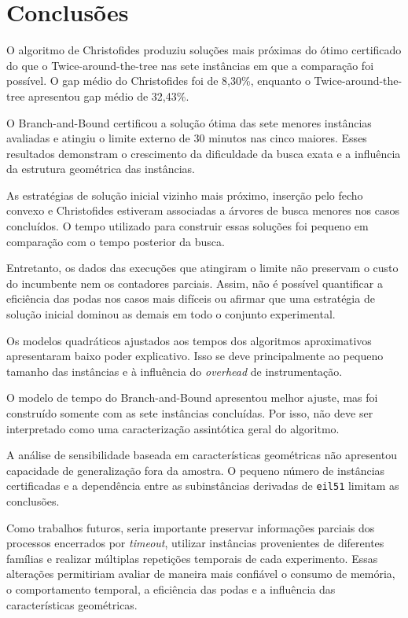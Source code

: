 \documentclass[12pt]{article}
\begin{document}
\section{Conclusões}

O algoritmo de Christofides produziu soluções mais próximas do ótimo certificado do que o Twice-around-the-tree nas sete instâncias em que a comparação foi possível. O gap médio do Christofides foi de 8,30\%, enquanto o Twice-around-the-tree apresentou gap médio de 32,43\%.

O Branch-and-Bound certificou a solução ótima das sete menores instâncias avaliadas e atingiu o limite externo de 30 minutos nas cinco maiores. Esses resultados demonstram o crescimento da dificuldade da busca exata e a influência da estrutura geométrica das instâncias.

As estratégias de solução inicial vizinho mais próximo, inserção pelo fecho convexo e Christofides estiveram associadas a árvores de busca menores nos casos concluídos. O tempo utilizado para construir essas soluções foi pequeno em comparação com o tempo posterior da busca.

Entretanto, os dados das execuções que atingiram o limite não preservam o custo do incumbente nem os contadores parciais. Assim, não é possível quantificar a eficiência das podas nos casos mais difíceis ou afirmar que uma estratégia de solução inicial dominou as demais em todo o conjunto experimental.

Os modelos quadráticos ajustados aos tempos dos algoritmos aproximativos apresentaram baixo poder explicativo. Isso se deve principalmente ao pequeno tamanho das instâncias e à influência do \emph{overhead} de instrumentação.

O modelo de tempo do Branch-and-Bound apresentou melhor ajuste, mas foi construído somente com as sete instâncias concluídas. Por isso, não deve ser interpretado como uma caracterização assintótica geral do algoritmo.

A análise de sensibilidade baseada em características geométricas não apresentou capacidade de generalização fora da amostra. O pequeno número de instâncias certificadas e a dependência entre as subinstâncias derivadas de \texttt{eil51} limitam as conclusões.

Como trabalhos futuros, seria importante preservar informações parciais dos processos encerrados por \emph{timeout}, utilizar instâncias provenientes de diferentes famílias e realizar múltiplas repetições temporais de cada experimento. Essas alterações permitiriam avaliar de maneira mais confiável o consumo de memória, o comportamento temporal, a eficiência das podas e a influência das características geométricas.
\end{document}
